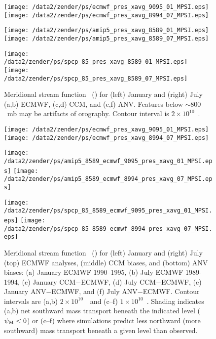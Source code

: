\documentclass[twocolumn,final]{article}
\begin{document}
\begin{figure*}
\begin{center}
\texttt{[image: /data2/zender/ps/ecmwf\_pres\_xavg\_9095\_01\_MPSI.eps]}%
\texttt{[image: /data2/zender/ps/ecmwf\_pres\_xavg\_8994\_07\_MPSI.eps]}%

\texttt{[image: /data2/zender/ps/amip5\_pres\_xavg\_8589\_01\_MPSI.eps]}%
\texttt{[image: /data2/zender/ps/amip5\_pres\_xavg\_8589\_07\_MPSI.eps]}%

\texttt{[image: /data2/zender/ps/spcp\_85\_pres\_xavg\_8589\_01\_MPSI.eps]}%
\texttt{[image: /data2/zender/ps/spcp\_85\_pres\_xavg\_8589\_07\_MPSI.eps]}%
\end{center}
\caption[Meridional stream function \mpsi\ for January and
July ECMWF, CCM, and ANV]{
Meridional stream function \mpsi\ (\kgxs) for (left) January and
(right) July (a,b) ECMWF, (c,d) CCM, and (e,f) ANV. 
Features below $\sim 800$~mb may be artifacts of orography.
Contour interval is $2 \times 10^{10}$~\kgxs.  
\label{fig:pres_xavg_8589_MPSI}}   
\end{figure*}
\clearpage

\begin{figure*}
\begin{center}
\texttt{[image: /data2/zender/ps/ecmwf\_pres\_xavg\_9095\_01\_MPSI.eps]}%
\texttt{[image: /data2/zender/ps/ecmwf\_pres\_xavg\_8994\_07\_MPSI.eps]}%

\texttt{[image: /data2/zender/ps/amip5\_8589\_ecmwf\_9095\_pres\_xavg\_01\_MPSI.eps]}%
\texttt{[image: /data2/zender/ps/amip5\_8589\_ecmwf\_8994\_pres\_xavg\_07\_MPSI.eps]}%

\texttt{[image: /data2/zender/ps/spcp\_85\_8589\_ecmwf\_9095\_pres\_xavg\_01\_MPSI.eps]}%
\texttt{[image: /data2/zender/ps/spcp\_85\_8589\_ecmwf\_8994\_pres\_xavg\_07\_MPSI.eps]}%
\end{center}
\caption[Meridional stream function \mpsi\ for January
and July ECMWF analyses, CCM biases, and ANV biases]{
Meridional stream function \mpsi\ (\kgxs) for (left) January
and (right) July (top) ECMWF analyses, (middle) CCM biases, and (bottom)
ANV biases: (a) January ECMWF 1990--1995, (b) July ECMWF 1989-1994,
(c) January CCM$-$ECMWF, (d) July CCM$-$ECMWF, (e) January
ANV$-$ECMWF, and (f) July ANV$-$ECMWF.
Contour intervals are (a,b) $2 \times 10^{10}$~\kgxs\ and (c--f) $1
\times 10^{10}$~\kgxs.  
Shading indicates (a,b) net southward mass transport beneath the
indicated level ($\mbox{$\psi_\mathrm{M}$} < 0$) or (c--f) where simulations predict less
northward (more southward) mass transport beneath a given level than
observed.   
\label{fig:pres_xavg_8589_MPSI}}   
\end{figure*}
\clearpage
\end{document}
